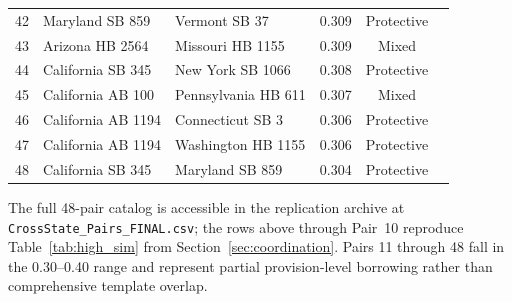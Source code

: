 \documentclass[12pt]{report}
\begin{document}
\begin{longtable}{rlllcl}
42 & Maryland SB 859      & Vermont SB 37        & 0.309 & Protective  \\
43 & Arizona HB 2564      & Missouri HB 1155     & 0.309 & Mixed       \\
44 & California SB 345    & New York SB 1066     & 0.308 & Protective  \\
45 & California AB 100    & Pennsylvania HB 611  & 0.307 & Mixed       \\
46 & California AB 1194   & Connecticut SB 3     & 0.306 & Protective  \\
47 & California AB 1194   & Washington HB 1155   & 0.306 & Protective  \\
48 & California SB 345    & Maryland SB 859      & 0.304 & Protective  \\
\end{longtable}

The full 48-pair catalog is accessible in the replication archive at
\texttt{CrossState\_Pairs\_FINAL.csv}; the rows above through Pair~10 reproduce
Table~\ref{tab:high_sim} from Section~\ref{sec:coordination}. Pairs 11 through 48 fall
in the 0.30--0.40 range and represent partial provision-level borrowing rather than
comprehensive template overlap.


\printbibliography[heading=bibintoc, title={References}]
\end{document}
